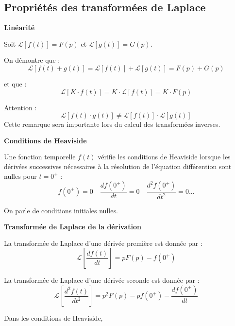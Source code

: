 \documentclass[10pt,fleqn]{article} %
\begin{document}
\subsection{Propriétés des transformées de Laplace}

\textbf{Linéarité}

Soit $\mathcal{L}\left[f(t)\right] = F(p)$ et $\mathcal{L}\left[g(t)\right] =
G(p)$.

On démontre que :
$$\mathcal{L}\left[f(t) + g(t)\right] = 
\mathcal{L}\left[f(t)\right] +\mathcal{L}\left[g(t)\right] = F(p)+G(p)$$

et que :
$$\mathcal{L}\left[K\cdot f(t)\right] = K\cdot \mathcal{L}\left[f(t)\right]
=K\cdot F(p)$$


\begin{warn}
Attention : 
$$\mathcal{L}\left[f(t) \cdot g(t)\right] \neq \mathcal{L}\left[f(t)\right]
\cdot \mathcal{L}\left[g(t)\right] $$
Cette remarque sera importante lors du calcul des transformées inverses.
\end{warn}


\textbf{Conditions de Heaviside}

Une fonction temporelle $f(t)$ vérifie les conditions de Heaviside lorsque les dérivées successives nécessaires à la résolution de l'équation différention sont nulles pour $t={0^{+}}$ :
$$
f({0^{+}})=0 \quad \dfrac{df({0^{+}})}{dt} = 0 \quad \dfrac{d^2f({0^{+}})}{dt^2} = 0 ...
$$

On parle de conditions initiales nulles.

\textbf{Transformée de Laplace de la dérivation}

La transformée de Laplace d'une dérivée première est donnée par : 
$$\mathcal{L}\left[ \dfrac{df(t)}{dt}\right] =pF(p)-f(0^+)$$

La transformée de Laplace d'une dérivée seconde est donnée par : 
$$\mathcal{L}\left[ \dfrac{d^2f(t)}{dt^2}\right] =p^2F(p)-pf(0^+)-\dfrac{df(0^+)}{dt}$$

Dans les conditions de Heaviside, 

\end{document}
